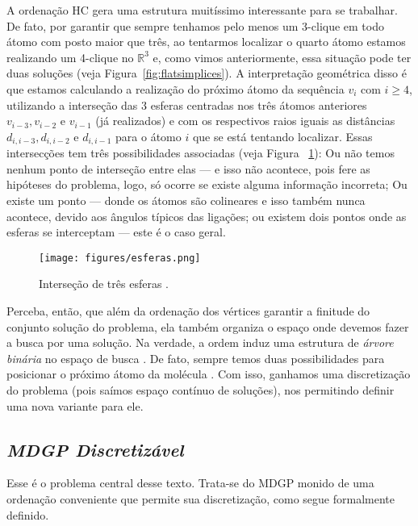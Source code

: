 A ordenação HC gera uma estrutura muitíssimo interessante para se trabalhar. De fato, por garantir que sempre tenhamos pelo menos um 3-clique em todo átomo com posto maior que três, ao tentarmos localizar o quarto átomo estamos realizando um 4-clique no $\mathbb{R}^3$ e, como vimos anteriormente, essa situação pode ter duas soluções (veja Figura~\ref{fig:flatsimplices}). A interpretação geométrica disso é que estamos calculando a realização do próximo átomo da sequência $v_i$ com $i \geq 4$, utilizando a interseção das 3 esferas centradas nos três átomos anteriores $v_{i-3}, v_{i-2}$ e $v_{i-1}$ (já realizados) e com os respectivos raios iguais as distâncias $d_{i,i-3}, d_{i,i-2}$ e $d_{i,i-1}$ para o átomo $i$ que se está tentando localizar. 
Essas intersecções tem três possibilidades associadas (veja Figura ~\ref{fig:esferas}): Ou não temos nenhum ponto de interseção entre elas --- e isso não acontece, pois fere as hipóteses do problema, logo, só ocorre se existe alguma informação incorreta; Ou existe um ponto --- donde os átomos são colineares e isso também nunca acontece, devido aos ângulos típicos das ligações; ou existem dois pontos onde as esferas se interceptam --- este é o caso geral.

\begin{figure}[H]
	\begin{center}
		\texttt{[image: figures/esferas.png]}
	\end{center}
	\caption{Interseção de três esferas \cite{carlileBook31Coloquio}.}
	\label{fig:esferas}
\end{figure}

Perceba, então, que além da ordenação dos vértices garantir a finitude do conjunto solução do problema, ela também organiza o espaço onde devemos fazer a busca por uma solução. Na verdade, a ordem induz uma estrutura de \textit{árvore binária} no espaço de busca \cite{fidalgotese}. De fato, sempre temos duas possibilidades para posicionar o próximo átomo da molécula \cite{carlileGDandAplications}. Com isso, ganhamos uma discretização do problema (pois saímos espaço contínuo de soluções), nos permitindo definir uma nova variante para ele.

\subsection{\textit{MDGP Discretizável}}
Esse é o problema central desse texto. Trata-se do MDGP monido de uma ordenação conveniente que permite sua discretização, como segue formalmente definido.

